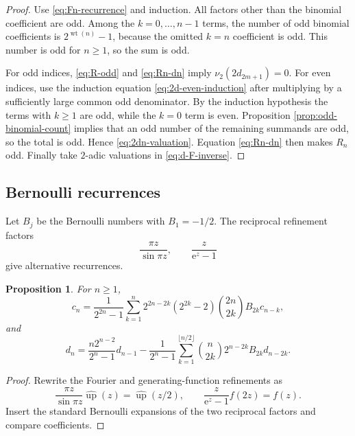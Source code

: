 \documentclass[11pt]{article}
\numberwithin{equation}{section}
\newtheorem{proposition}[theorem]{Proposition}
\theoremstyle{definition}
\theoremstyle{remark}
\DeclareMathOperator{\wt}{wt}
\newcommand{\e}{\mathrm{e}}
\newcommand{\upf}{\operatorname{up}}
\begin{document}
\begin{proof}
Use \eqref{eq:Fn-recurrence} and induction.  All factors other than the
binomial coefficient are odd.  Among the $k=0,\ldots,n-1$ terms, the number
of odd binomial coefficients is $2^{\wt(n)}-1$, because the omitted
$k=n$ coefficient is odd.  This number is odd for $n\ge1$, so the sum is odd.

For odd indices, \eqref{eq:R-odd} and \eqref{eq:Rn-dn} imply
$\nu_2(2d_{2m+1})=0$.  For even indices, use the induction equation
\eqref{eq:2d-even-induction} after multiplying by a sufficiently large common
odd denominator.  By the induction hypothesis the terms with $k\ge1$ are
odd, while the $k=0$ term is even.  Proposition
\ref{prop:odd-binomial-count} implies that an odd number of the remaining
summands are odd, so the total is odd.  Hence \eqref{eq:2dn-valuation}.
Equation \eqref{eq:Rn-dn} then makes $R_n$ odd.  Finally take $2$-adic
valuations in \eqref{eq:d-F-inverse}.
\end{proof}

\subsection{Bernoulli recurrences}

Let $B_j$ be the Bernoulli numbers with $B_1=-1/2$.  The reciprocal
refinement factors
\[
 \frac{\pi z}{\sin\pi z},
 \qquad
 \frac{z}{\e^z-1}
\]
give alternative recurrences.

\begin{proposition}\label{prop:bernoulli-recurrences}
For $n\ge1$,
\begin{equation}\label{eq:c-bernoulli}
 c_n=\frac1{2^{2n}-1}
 \sum_{k=1}^{n}2^{2n-2k}(2^{2k}-2)
 \binom{2n}{2k}B_{2k}c_{n-k},
\end{equation}
and
\begin{equation}\label{eq:d-bernoulli}
 d_n=\frac{n2^{n-2}}{2^n-1}d_{n-1}
 -\frac1{2^n-1}
 \sum_{k=1}^{\lfloor n/2\rfloor}
 \binom{n}{2k}2^{n-2k}B_{2k}d_{n-2k}.
\end{equation}
\end{proposition}

\begin{proof}
Rewrite the Fourier and generating-function refinements as
\[
 \frac{\pi z}{\sin\pi z}\widehat{\upf}(z)=\widehat{\upf}(z/2),
 \qquad
 \frac{z}{\e^z-1}f(2z)=f(z).
\]
Insert the standard Bernoulli expansions of the two reciprocal factors and
compare coefficients.
\end{proof}
\end{document}
